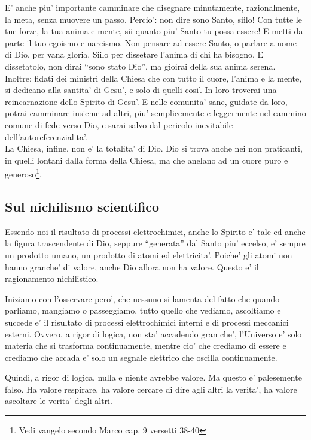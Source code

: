 E' anche piu' importante camminare che disegnare minutamente, razionalmente, la meta, senza muovere un passo.  Percio': non dire sono Santo, siilo!  Con tutte le tue forze, la tua anima e mente, sii quanto piu' Santo tu possa essere! E metti da parte il tuo egoismo e narcismo.  Non pensare ad essere Santo, o parlare a nome di Dio, per vana gloria. Siilo per dissetare l'anima di chi ha bisogno. E dissetatolo, non dirai ``sono stato Dio'', ma gioirai della sua anima serena.\\
Inoltre: fidati dei ministri della Chiesa che con tutto il cuore, l'anima e la mente, si dedicano alla santita' di Gesu', e solo di quelli cosi'. In loro troverai una reincarnazione dello Spirito di Gesu'. E nelle comunita' sane, guidate da loro, potrai camminare insieme ad altri, piu' semplicemente e leggermente nel cammino comune di fede verso Dio, e sarai salvo dal pericolo inevitabile dell'autoreferenzialita'.\\
La Chiesa, infine, non e' la totalita' di Dio. Dio si trova anche nei non praticanti, in quelli lontani dalla forma della Chiesa, ma che anelano ad un cuore puro e generoso\footnote{Vedi vangelo secondo Marco cap. 9 versetti 38-40}.

\subsection{Sul nichilismo scientifico}
\label{sulNichilismoScientifico}

Essendo noi il risultato di processi elettrochimici, anche lo Spirito e' tale ed anche la figura trascendente di Dio, seppure ``generata'' dal Santo piu' eccelso, e' sempre un prodotto umano, un prodotto di atomi ed elettricita'. Poiche' gli atomi non hanno granche' di valore, anche Dio allora non ha valore. Questo e' il ragionamento nichilistico.

Iniziamo con l'osservare pero', che nessuno si lamenta del fatto che quando parliamo, mangiamo o passeggiamo, tutto quello che vediamo, ascoltiamo e succede e' il risultato di processi elettrochimici interni e di processi meccanici esterni. Ovvero, a rigor di logica, non sta' accadendo gran che', l'Universo e' solo materia che si trasforma continuamente, mentre cio' che crediamo di essere e crediamo che accada e' solo un segnale elettrico che oscilla continuamente.

Quindi, a rigor di logica, nulla e niente avrebbe valore. Ma questo e' palesemente falso. Ha valore respirare, ha valore cercare di dire agli altri la verita', ha valore ascoltare le verita' degli altri.

